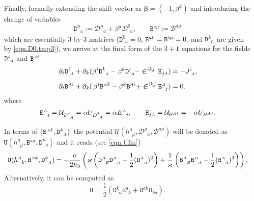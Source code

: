\documentclass[
10pt, %
a4paper, %
oneside, %
headinclude,footinclude, %
BCOR5mm, %
]{scrartcl}
\newcommand{\sA}{\mathsmaller A}
\newcommand{\sB}{\mathsmaller B}
\newcommand{\pd}[1]{\partial_{#1}}
\newcommand{\tetrsymbol}{h}
\newcommand{\tetr}[2]{\tetrsymbol^{#1}_{\phantom{#1}#2}}
\newcommand{\detTetr}{\tetrsymbol}
\newcommand{\ET}[2]{E^{#1}_{\phantom{#1}#2}}	%
\newcommand{\Dm}[2]{D_{\phantom{#2}#1}^{#2}}	%
\newcommand{\aD}[2]{\mathcal{D}_{\phantom{#2}#1}^{#2}}	%
\newcommand{\Dfin}[2]{\mathtt{D}_{\phantom{#2}#1}^{#2}}	%
\newcommand{\Hfin}[2]{\mathtt{H}_{#2#1}}	%
\newcommand{\Efin}[2]{\mathtt{E}^{#1}_{\phantom{#1}#2}}	%
\newcommand{\Ufin}{\mathtt{U}}
\newcommand{\Bm}[2]{B^{#1#2}}	%
\newcommand{\aB}[2]{\mathcal{B}^{#1#2}}	%
\newcommand{\Bfin}[2]{\mathtt{B}^{#1#2}}	%
\newcommand{\Bfinmix}[2]{\mathtt{B}^{#1}_{\phantom{#1}#2}}	%
\newcommand{\Um}{U}%
\newcommand{\aU}{\mathcal{U}}%
\newcommand{\LCsymb}{\bm{\in}}    %
\newcommand{\NC}[2]{J^{#2}_{\phantom{#2}#1}}
\newcommand{\indalg}[1]{\hat{\mathsmaller{#1}}}
\newcommand{\shift}[1]{\beta^{#1}}
\begin{document}
Finally, formally extending the shift vector as $ \bm{\beta}=(-1,\beta^{k}) $ and introducing the 
change of variables
\begin{equation}\label{eqn.varDB.final}
	\Dfin{a}{\mu} := \aD{a}{\mu} + \beta^{\mu} \aD{a}{0}, \qquad \Bfin{a}{\mu} := \aB{a}{\mu}
\end{equation}
which are essentially $ 3 $-by-$ 3 $ matrices ($ \Dfin{a}{0} = 0$, $ \Bfin{a}{0} = 
\Bfin{\indalg{0}}{\mu} = 0 $, and $ \Dfin{\indalg{0}}{k} $ are given by \eqref{eqn.D0.tmp3}),
we arrive at the final form of the $ 3+1 $ equations for the fields $ \Dfin{\sA}{i} $ and $ 
\Bfin{\sA}{i} $
\begin{subequations}\label{eqn.PDE.BD.final}
	\begin{align}
		\pd{t} \Dfin{\sA}{i} + \pd{k}(\shift{i} 
		\Dfin{\sA}{k} - \shift{k}\Dfin{\sA}{i}  - \LCsymb^{ikj} \,
		\Hfin{\sA}{j}) & 
		= -\NC{\sA}{i}, \label{eqn.tpo.D}\\[2mm]
		\pd{t} \Bfin{\sA}{i} + \pd{k}(\,\shift{i} 
		\Bfin{\sA}{k} - \shift{k}\Bfin{\sA}{i}  + \LCsymb^{ikj} 
		\Efin{\sA}{j}) & 
		= 0\label{eqn.tpo.B} .
	\end{align}
\end{subequations}
where
\begin{equation}\label{eqn.HE.fin}
	\Efin{\sA}{j} = \aU_{\aD{\sA}{j}} = \alpha \Um_{\Dm{\sA}{j}}= \alpha \ET{\sA}{j},
	\qquad
	\Hfin{\sA}{j} = \aU_{\aB{\sA}{j}} =-\alpha \Um_{\Bm{\sA}{j}}.
\end{equation}

In terms of $ \{\Bfin{\sA}{k},\Dfin{\sA}{k}\} $ the potential $  
\aU(\tetr{a}{\mu},\aD{a}{\mu},\aB{a}{\mu}) $ will be denoted as 
$
\Ufin(\tetr{a}{\mu},\Bfin{a}{\mu},\Dfin{a}{\mu})  
$ and it reads (see \eqref{eqn.Ufin})
\begin{subequations}
	\begin{equation}
		\Ufin(\tetr{\sA}{k},\Bfin{\sA}{k},\Dfin{\sA}{k}) = 
		-\frac{\alpha}{2\detTetr_3} \left( 
		\varkappa \left( \Dfin{\sB}{\sA} \Dfin{\sA}{\sB} - \frac{1}{2} (\Dfin{\sA}{\sA})^2\right)
		+
		\frac{1}{\varkappa} \left( \Bfinmix{\sA}{\sB} \Bfinmix{\sB}{\sA} - \frac{1}{2} 
		(\Bfinmix{\sA}{\sA})^2
		\right)
		\right),
	\end{equation}
\end{subequations}
Alternatively, it can be computed as
\begin{equation}\label{eqn.U.bdeh}
	\Ufin = \frac{1}{2} ( \Dfin{a}{k} \Efin{a}{k} + \Bfin{a}{k} \Hfin{a}{k} ).
\end{equation} 
\end{document}
